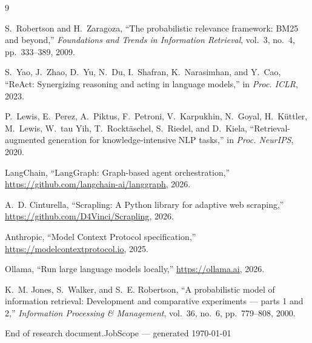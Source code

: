 \documentclass[11pt,a4paper]{article}
\begin{document}
\begin{thebibliography}{9}

S.~Robertson and H.~Zaragoza,
\newblock ``The probabilistic relevance framework: BM25 and beyond,''
\newblock \emph{Foundations and Trends in Information Retrieval}, vol.~3, no.~4, pp.~333--389, 2009.

S.~Yao, J.~Zhao, D.~Yu, N.~Du, I.~Shafran, K.~Narasimhan, and Y.~Cao,
\newblock ``ReAct: Synergizing reasoning and acting in language models,''
\newblock in \emph{Proc. ICLR}, 2023.

P.~Lewis, E.~Perez, A.~Piktus, F.~Petroni, V.~Karpukhin, N.~Goyal,
H.~K\"{u}ttler, M.~Lewis, W.~tau Yih, T.~Rockt\"{a}schel, S.~Riedel, and
D.~Kiela,
\newblock ``Retrieval-augmented generation for knowledge-intensive NLP tasks,''
\newblock in \emph{Proc. NeurIPS}, 2020.

LangChain,
\newblock ``LangGraph: Graph-based agent orchestration,''
\newblock \url{https://github.com/langchain-ai/langgraph}, 2026.

A.~D. Cinturella,
\newblock ``Scrapling: A Python library for adaptive web scraping,''
\newblock \url{https://github.com/D4Vinci/Scrapling}, 2026.

Anthropic,
\newblock ``Model Context Protocol specification,''
\newblock \url{https://modelcontextprotocol.io}, 2025.

Ollama,
\newblock ``Run large language models locally,''
\newblock \url{https://ollama.ai}, 2026.

K.~M. Jones, S.~Walker, and S.~E. Robertson,
\newblock ``A probabilistic model of information retrieval: Development and
comparative experiments --- parts 1 and 2,''
\newblock \emph{Information Processing \& Management}, vol.~36, no.~6,
pp.~779--808, 2000.

\end{thebibliography}

\vfill
\begin{center}
{\small\color{gray} End of research document.\quad JobScope --- generated \today}
\end{center}
\end{document}
